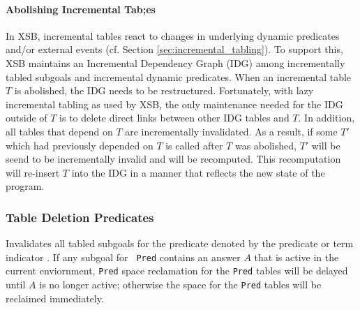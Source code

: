 \begin{description}
\paragraph{Abolishing Incremental Tab;es}
In XSB, incremental tables react to changes in underlying dynamic
predicates and/or external events (cf. Section
\ref{sec:incremental_tabling}).  To support this, XSB maintains an
Incremental Dependency Graph (IDG) among incrementally tabled subgoals
and incremental dynamic predicates.  When an incremental table $T$ is
abolished, the IDG needs to be restructured.  Fortunately, with lazy
incremental tabling as used by XSB, the only maintenance needed for
the IDG outside of $T$ is to delete direct links between other IDG
tables and $T$.  In addition, all tables that depend on $T$ are
incrementally invalidated.  As a result, if some $T'$ which had
previously depended on $T$ is called after $T$ was abolished, $T'$
will be seend to be incrementally invalid and will be recomputed.
This recomputation will re-insert $T$ into the IDG in a manner that
reflects the new state of the program.


\subsubsection{Table Deletion Predicates}

\begin{description}
%
Invalidates all tabled subgoals for the predicate denoted by the
predicate or term indicator .  If any subgoal for {\tt
  Pred} contains an answer $A$ that is active in the current
enviornment, {\tt Pred} space reclamation for the {\tt Pred} tables
will be delayed until $A$ is no longer active; otherwise the space for
the {\tt Pred} tables will be reclaimed immediately.  


\end{description}
\end{description}

